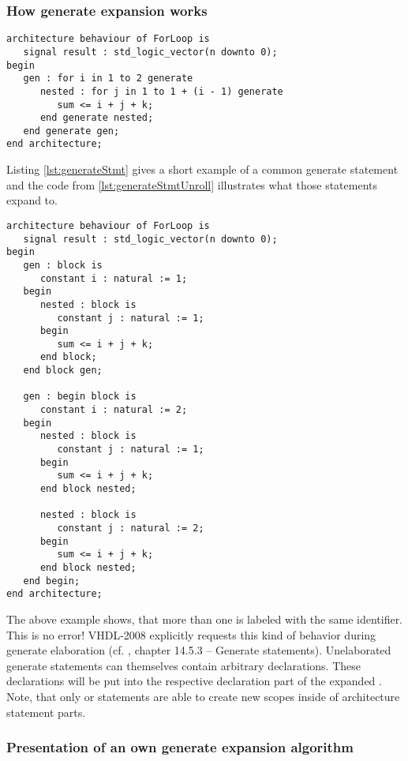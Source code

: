 \subsubsection{How generate expansion works}
\begin{lstlisting}[style=vhdl,caption={A nested generate
      statement},label={lst:generateStmt}]
architecture behaviour of ForLoop is
   signal result : std_logic_vector(n downto 0);
begin
   gen : for i in 1 to 2 generate
      nested : for j in 1 to 1 + (i - 1) generate
         sum <= i + j + k;
      end generate nested;
   end generate gen;
end architecture;
\end{lstlisting}
%
Listing \ref{lst:generateStmt} gives a short example of a common
generate statement and the code from \ref{lst:generateStmtUnroll}
illustrates what those statements expand to.
%
\begin{lstlisting}[style=vhdl,caption={Generate statement unrolling},label={lst:generateStmtUnroll}]
architecture behaviour of ForLoop is
   signal result : std_logic_vector(n downto 0);
begin
   gen : block is
      constant i : natural := 1;
   begin
      nested : block is
         constant j : natural := 1;
      begin
         sum <= i + j + k;
      end block;
   end block gen;

   gen : begin block is
      constant i : natural := 2;
   begin
      nested : block is
         constant j : natural := 1;
      begin
         sum <= i + j + k;
      end block nested;

      nested : block is
         constant j : natural := 2;
      begin
         sum <= i + j + k;
      end block nested;
   end begin;
end architecture;
\end{lstlisting}
%
The above example shows, that more than one  is labeled with
the same identifier. This is no error! VHDL-2008 explicitly requests
this kind of behavior during generate elaboration (cf. \cite{IEEELRM},
chapter 14.5.3 -- Generate statements).
Unelaborated generate statements can
themselves contain arbitrary declarations. These declarations will be
put into the respective declaration part of the expanded .
Note, that only  or  statements are able to create
new scopes inside of architecture statement parts.

\subsubsection{Presentation of an own generate expansion algorithm}


